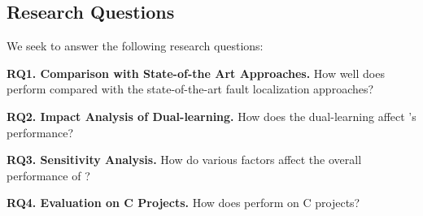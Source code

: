 \subsection{Research Questions}

We seek to answer the following research questions:

\noindent\textbf{RQ1. Comparison with State-of-the Art Approaches.}
How well does {\tool} perform compared with the state-of-the-art fault
localization approaches?

\noindent\textbf{RQ2. Impact Analysis of Dual-learning.} 
How does the dual-learning affect {\tool}'s performance?

\noindent\textbf{RQ3. Sensitivity Analysis.} How do various factors affect the overall performance of {\tool}?


\noindent\textbf{RQ4. Evaluation on C Projects.} How does {\tool} perform on C projects?
